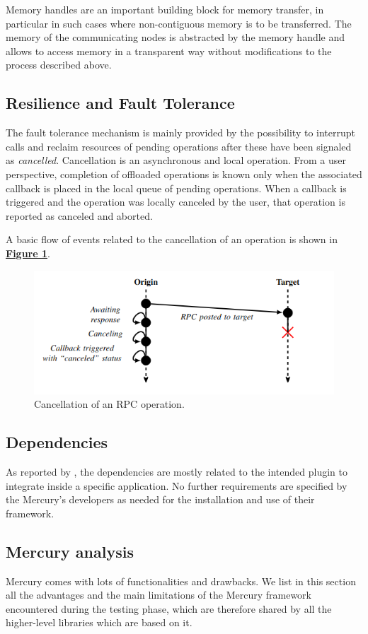 Memory handles are an important building block for memory transfer, in particular in such cases where non-contiguous memory is to be transferred. The memory of the communicating nodes is abstracted by the memory handle and allows to access memory in a transparent way without modifications to the process described above.

\subsection{Resilience and Fault Tolerance}
The fault tolerance mechanism is mainly provided by the possibility to interrupt calls and reclaim resources of pending operations after these have been signaled as \textit{cancelled}. Cancellation is an asynchronous and local operation. From a user perspective, completion of offloaded operations is known only when the associated callback is placed in the local queue of pending operations. When a callback is triggered and the operation was locally canceled by the user, that operation is reported as canceled and aborted.\newline

A basic flow of events related to the cancellation of an operation is shown in \hyperref[fig:op-cancel]{\textbf{Figure \ref{fig:op-cancel}}}.

\begin{figure}[H]
    \centering
    \includegraphics[width=0.6\linewidth]{res/op-cancel.png}
    \caption{Cancellation of an RPC operation.}
    \label{fig:op-cancel}
\end{figure}

\subsection{Dependencies}
As reported by \cite{merc_git}, the dependencies are mostly related to the intended plugin to integrate inside a specific application. No further requirements are specified by the Mercury's developers as needed for the installation and use of their framework.


\subsection{Mercury analysis}
\label{sec:mercury-analysis}
Mercury comes with lots of functionalities and drawbacks. We list in this section all the advantages and the main limitations of the Mercury framework encountered during the testing phase, which are therefore shared by all the higher-level libraries which are based on it.

